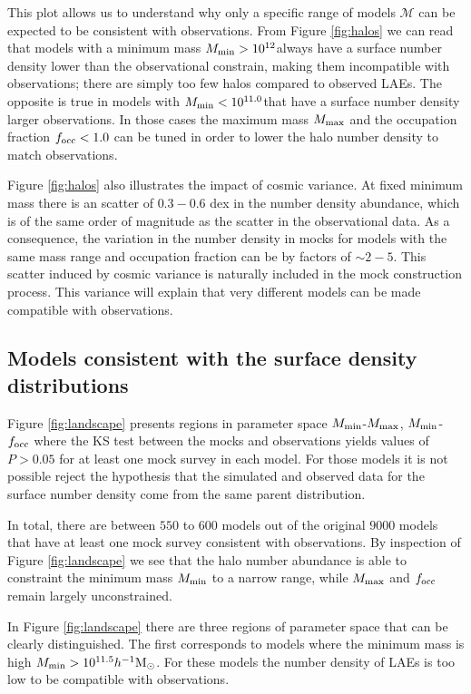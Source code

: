 \documentclass[usenatbib]{mn2e}
\newcommand{\hMsun}{{\ifmmode{h^{-1}{\rm
        {M_{\odot}}}}\else{$h^{-1}{\rm{M_{\odot}}}$}\fi}}
\begin{document}
This plot allows us to understand why only a specific range of
models ${\mathcal M}$ can be expected to be consistent with
observations. From Figure \ref{fig:halos} we can read that models with
a minimum mass $M_{\rm min}>10^{12}$\hMsun always have a
surface number density lower than the observational constrain, making
them incompatible with observations; there are simply too few halos compared to observed
LAEs. The opposite is true in models with $M_{\rm
  min}<10^{11.0}$\hMsun that have a surface number density larger
observations. In those cases the maximum mass $M_{\rm max}$ and the
occupation fraction $f_{\rm occ}<1.0$  can be tuned in order to lower
the halo number density to match observations.   


Figure \ref{fig:halos} also illustrates the impact of cosmic
variance. At fixed minimum mass there is an scatter of $0.3-0.6$ dex
in the number density abundance, which is of the same order of
magnitude as the scatter in the observational data.  As a consequence, the variation in
the number density in mocks for models with the same mass range and occupation
fraction can be by factors of $\sim 2-5$.  This scatter induced by
cosmic variance is naturally included in the mock construction
process. This variance will explain that very different models can be
made compatible with observations. 


\subsection{Models consistent with the surface density distributions}


Figure \ref{fig:landscape} presents regions in parameter space $M_{\rm
min}$-$M_{\rm max}$, $M_{\rm min}$-$f_{\rm occ}$ where the KS test
between the mocks and observations yields values of $P>0.05$ for at
least one mock survey in each model. For those models it
is not possible reject the hypothesis that the simulated and observed
data for the surface number density come from the same parent
distribution. 

In total, there are between $550$ to $600$ models out of the original
$9000$ models that have at least one mock survey consistent with
observations. By inspection of Figure \ref{fig:landscape} we see that
the halo number abundance is able to constraint the minimum mass
$M_{\rm min}$ to a narrow range, while $M_{\rm max}$ and $f_{\rm occ}$
remain largely unconstrained. 

In Figure \ref{fig:landscape} there are three regions of parameter
space that can be clearly distinguished. The first corresponds to
models where the minimum mass is high $M_{\rm min}>
10^{11.5}\hMsun$.  For these models the number density of LAEs is too low
to be compatible with observations. 
\end{document}
